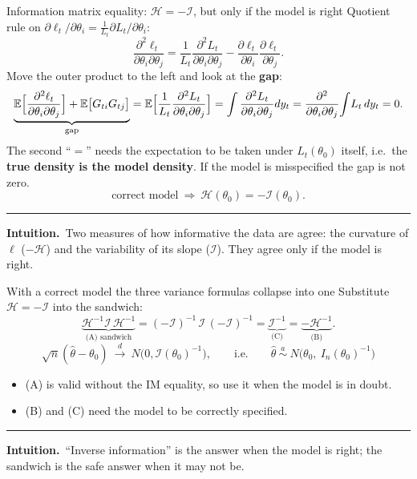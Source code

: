 \documentclass[aspectratio=169,11pt,t]{beamer}
\newcommand{\E}{\mathbb{E}}
\newcommand{\cI}{\mathcal{I}}          %
\newcommand{\In}{I_{n}}                %
\newcommand{\cH}{\mathcal{H}}          %
\newcommand{\hth}{\hat\theta}
\newcommand{\thz}{\theta_{0}}
\newcommand{\asim}{\overset{a}{\sim}}
\newcommand{\dto}{\overset{d}{\longrightarrow}}
\newcommand{\intuition}[1]{\par\vfill
  {\color{intu}\rule{\linewidth}{0.4pt}}\par\vspace{1pt}
  {\small\color{intu}\textbf{Intuition.}\ #1}\par\vspace{2pt}}
\begin{document}
\begin{frame}{Information matrix equality: $\cH=-\cI$, but only if the model is right}
Quotient rule on $\partial\ell_{t}/\partial\theta_{i}=\frac{1}{L_{t}}\partial L_{t}/\partial\theta_{i}$:
\[ \frac{\partial^{2}\ell_{t}}{\partial\theta_{i}\partial\theta_{j}}
 =\frac{1}{L_{t}}\frac{\partial^{2}L_{t}}{\partial\theta_{i}\partial\theta_{j}}
 -\frac{\partial\ell_{t}}{\partial\theta_{i}}\frac{\partial\ell_{t}}{\partial\theta_{j}} . \]
Move the outer product to the left and look at the \textbf{gap}:
\[ \underbrace{\E\Bigl[\frac{\partial^{2}\ell_{t}}{\partial\theta_{i}\partial\theta_{j}}\Bigr]+\E\bigl[G_{ti}G_{tj}\bigr]}_{\text{gap}}
 =\E\Bigl[\frac{1}{L_{t}}\frac{\partial^{2}L_{t}}{\partial\theta_{i}\partial\theta_{j}}\Bigr]
 =\int\frac{\partial^{2}L_{t}}{\partial\theta_{i}\partial\theta_{j}}dy_{t}
 =\frac{\partial^{2}}{\partial\theta_{i}\partial\theta_{j}}\!\int\! L_{t}\,dy_{t}=0 . \]
The second ``$=$'' needs the expectation to be taken under $L_{t}(\thz)$ itself, i.e.\ the \textbf{true density is the model density}. If the model is misspecified the gap is not zero.
\[ \text{correct model}\ \Longrightarrow\ \cH(\thz)=-\cI(\thz). \]
\intuition{Two measures of how informative the data are agree: the curvature of $\ell$ ($-\cH$) and the variability of its slope ($\cI$). They agree only if the model is right.}
\end{frame}

\begin{frame}{With a correct model the three variance formulas collapse into one}
Substitute $\cH=-\cI$ into the sandwich:
\[ \underbrace{\cH^{-1}\cI\,\cH^{-1}}_{\text{(A) sandwich}}
 =(-\cI)^{-1}\,\cI\,(-\cI)^{-1}
 =\underbrace{\cI^{-1}}_{\text{(C)}}
 =\underbrace{-\cH^{-1}}_{\text{(B)}} . \]
\[ \boxed{\ \sqrt n(\hth-\thz)\ \dto\ N\bigl(0,\cI(\thz)^{-1}\bigr),
   \qquad\text{i.e.}\qquad \hth\ \asim\ N\bigl(\thz,\ \In(\thz)^{-1}\bigr)\ } \]
\begin{itemize}
 \item (A) is valid without the IM equality, so use it when the model is in doubt.
 \item (B) and (C) need the model to be correctly specified.
\end{itemize}
\intuition{``Inverse information'' is the answer when the model is right; the sandwich is the safe answer when it may not be.}
\end{frame}
\end{document}
